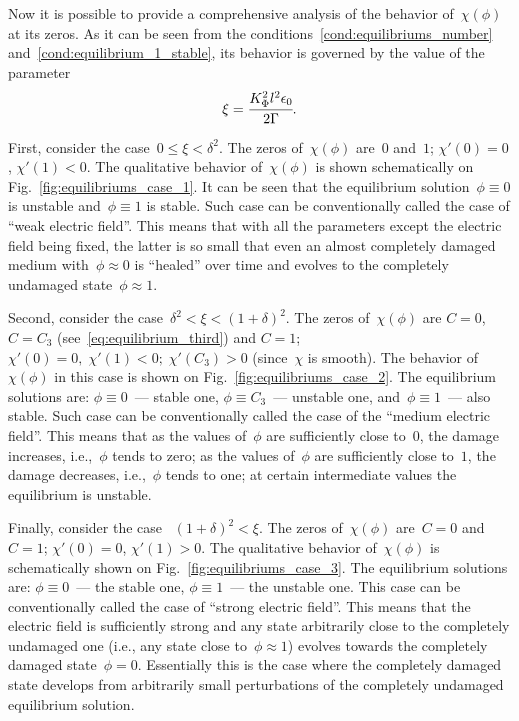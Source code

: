 Now it is possible to provide a comprehensive analysis of the behavior
of~$\chi(\phi)$ at its zeros. As it can be seen from the conditions~\eqref{cond:equilibriums_number} and~\eqref{cond:equilibrium_1_stable},
its behavior is governed by the value of the parameter
\begin{equation}
  \xi = \cfrac{K_\Phi^2 l^2 \epsilon_0}{2 \Gamma} {\text{.}}
  \label{char:equilibriums}
\end{equation}

First, consider the case~$0 \leqslant \xi < \delta^2$. The zeros
of~$\chi(\phi)$ are~$0$ and~$1$; $\chi'(0) = 0$, $\chi'(1) < 0$.
The qualitative behavior of~$\chi(\phi)$ is shown schematically on
Fig.~\ref{fig:equilibriums_case_1}.  It can be seen that the equilibrium
solution~$\phi \equiv 0$ is unstable and~$\phi \equiv 1$ is stable.
Such case can be conventionally called the case of ``weak electric field''.
This means that with all the parameters except the electric field being fixed,
the latter is so small that even an almost completely damaged
medium with~$\phi \approx 0$ is ``healed'' over time and evolves to the
completely undamaged state~$\phi \approx 1$.

Second, consider the case~$\delta^2 < \xi < (1 + \delta)^2$.
The zeros of~$\chi(\phi)$ are $C=0$, $C=C_3$
(see~\eqref{eq:equilibrium_third}) and $C=1$; $\chi'(0) = 0, \;
\chi'(1) < 0; \; \chi'(C_3) > 0$
(since~$\chi$ is smooth).
The behavior of~$\chi(\phi)$ in this case is shown on
Fig.~\ref{fig:equilibriums_case_2}.
The equilibrium solutions are: $\phi \equiv 0$~--- stable one, $\phi
\equiv C_3$~--- unstable one, and~$\phi \equiv 1$~--- also stable.
Such case can be conventionally called the case of the ``medium
electric field''.
This means that as the values of~$\phi$ are sufficiently close to~$0$,
the damage increases, i.e.,~$\phi$ tends to zero;
as the values of~$\phi$ are sufficiently close to~$1$,
the damage decreases, i.e.,~$\phi$ tends to one;
at certain intermediate values the equilibrium is unstable.

Finally, consider the case~ $(1 + \delta)^2 < \xi$.
The zeros of~$\chi(\phi)$ are~$C=0$ and~$C=1$; $\chi'(0) = 0$, $\chi'(1)>0$.
The qualitative behavior of~$\chi(\phi)$ is schematically shown on
Fig.~\ref{fig:equilibriums_case_3}.
The equilibrium solutions are: $\phi \equiv 0$~--- the stable one, $\phi
\equiv 1$~--- the unstable one.
This case can be conventionally called the case of ``strong
electric field''.
This means that the electric field is sufficiently strong and
any state arbitrarily close to the completely undamaged one
(i.e., any state close to~$\phi \approx 1$) evolves towards
the completely damaged state~$\phi= 0$.
Essentially this is the case where the completely damaged state develops
from arbitrarily small perturbations of the completely undamaged
equilibrium solution.

